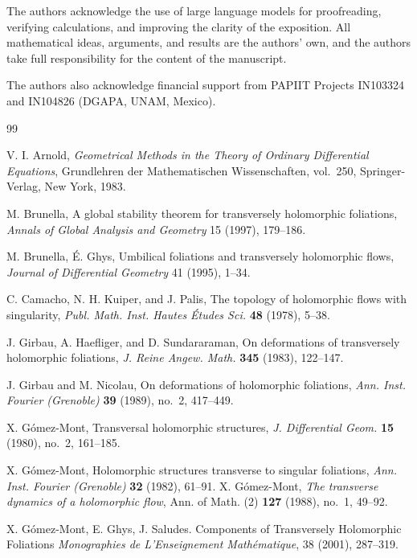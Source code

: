 \documentclass[11pt]{amsart}
\theoremstyle{definition}
\theoremstyle{remark}
\begin{document}
The authors acknowledge the use of large language models for proofreading, verifying calculations, and improving the clarity of the exposition. All mathematical ideas, arguments, and results are the authors’ own, and the authors take full responsibility for the content of the manuscript.

The authors also acknowledge financial support from PAPIIT Projects IN103324 and IN104826 (DGAPA, UNAM, Mexico).

\begin{thebibliography}{99}

	V.
	I.
	Arnold, \emph{Geometrical Methods in the Theory of Ordinary Differential Equations}, Grundlehren der Mathematischen Wissenschaften, vol.~250, Springer-Verlag, New York, 1983.

	M.
	Brunella, A global stability theorem for transversely holomorphic foliations, \emph{ Annals of Global Analysis and Geometry} 15 (1997), 179--186.

	M.
	Brunella, É.
	Ghys, Umbilical foliations and transversely holomorphic flows, \emph{Journal of Differential Geometry} 41 (1995), 1--34.

	C.
	Camacho, N.
	H.
	Kuiper, and J.
	Palis, The topology of holomorphic flows with singularity, \emph{Publ.
		Math.
		Inst.
		Hautes Études Sci.
	} \textbf{48} (1978),
	5--38.

	J.
	Girbau, A.
	Haefliger, and D.
	Sundararaman, On deformations of transversely holomorphic foliations, \emph{J.
		Reine Angew.
		Math.
	} \textbf{345} (1983), 122--147.

	J.
	Girbau and M.
	Nicolau, On deformations of holomorphic foliations, \emph{Ann.
		Inst.
		Fourier (Grenoble)} \textbf{39} (1989), no.~2, 417--449.

	X.
	Gómez-Mont, Transversal holomorphic structures, \emph{J.
		Differential Geom.
	} \textbf{15} (1980), no.~2, 161--185.

	X.
	Gómez-Mont, Holomorphic structures transverse to singular foliations, \emph{Ann.
		Inst.
		Fourier (Grenoble)} \textbf{32} (1982), 61--91.
	X.
	Gómez-Mont, \emph{The transverse dynamics of a holomorphic flow}, Ann.
	of Math. (2) \textbf{127} (1988), no.~1, 49--92.

	X.
	Gómez-Mont, E.
	Ghys, J.
	Saludes.
	Components of Transversely Holomorphic Foliations \emph{Monographies de L'Enseignement Mathématique}, 38 (2001), 287--319.


\end{thebibliography}
\end{document}
